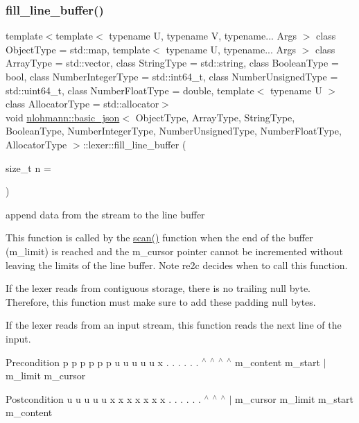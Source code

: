\subsubsection{\texorpdfstring{fill\+\_\+line\+\_\+buffer()}{fill\_line\_buffer()}}
{\footnotesize\ttfamily template$<$template$<$ typename U, typename V, typename... Args $>$ class Object\+Type = std\+::map, template$<$ typename U, typename... Args $>$ class Array\+Type = std\+::vector, class String\+Type  = std\+::string, class Boolean\+Type  = bool, class Number\+Integer\+Type  = std\+::int64\+\_\+t, class Number\+Unsigned\+Type  = std\+::uint64\+\_\+t, class Number\+Float\+Type  = double, template$<$ typename U $>$ class Allocator\+Type = std\+::allocator$>$ \\
void \hyperlink{classnlohmann_1_1basic__json}{nlohmann\+::basic\+\_\+json}$<$ Object\+Type, Array\+Type, String\+Type, Boolean\+Type, Number\+Integer\+Type, Number\+Unsigned\+Type, Number\+Float\+Type, Allocator\+Type $>$\+::lexer\+::fill\+\_\+line\+\_\+buffer (\begin{DoxyParamCaption}\item[{size\+\_\+t}]{n = {} }\end{DoxyParamCaption})\hspace{0.3cm}{\ttfamily [inline]}}



append data from the stream to the line buffer 

This function is called by the \hyperlink{classnlohmann_1_1basic__json_1_1lexer_a94193a4904687939efe186d2ae4397a1}{scan()} function when the end of the buffer ({\ttfamily m\+\_\+limit}) is reached and the {\ttfamily m\+\_\+cursor} pointer cannot be incremented without leaving the limits of the line buffer. Note re2c decides when to call this function.

If the lexer reads from contiguous storage, there is no trailing null byte. Therefore, this function must make sure to add these padding null bytes.

If the lexer reads from an input stream, this function reads the next line of the input.

\begin{DoxyPrecond}{Precondition}
p p p p p p u u u u u x . . . . . . $^\wedge$ $^\wedge$ $^\wedge$ $^\wedge$ m\+\_\+content m\+\_\+start $\vert$ m\+\_\+limit m\+\_\+cursor
\end{DoxyPrecond}
\begin{DoxyPostcond}{Postcondition}
u u u u u x x x x x x x . . . . . . $^\wedge$ $^\wedge$ $^\wedge$ $\vert$ m\+\_\+cursor m\+\_\+limit m\+\_\+start m\+\_\+content 
\end{DoxyPostcond}
\hypertarget{classnlohmann_1_1basic__json_1_1lexer_a5b8c24b51fefde08b8244113e3bfa070}{}\label{classnlohmann_1_1basic__json_1_1lexer_a5b8c24b51fefde08b8244113e3bfa070} 
